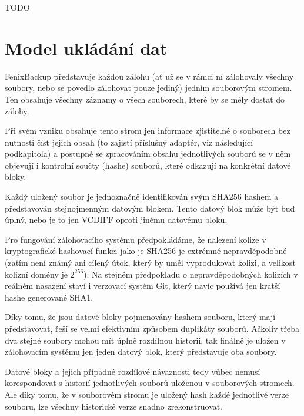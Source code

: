 TODO

\section{Model ukládání dat}

FenixBackup představuje každou zálohu (ať už se v rámci ní zálohovaly všechny
soubory, nebo se povedlo zálohovat pouze jediný) jedním souborovým stromem. Ten
obsahuje všechny záznamy o všech souborech, které by se měly dostat do zálohy.

Při svém vzniku obsahuje tento strom jen informace zjistitelné o souborech bez
nutnosti číst jejich obsah (to zajistí příslušný adaptér, viz následující
podkapitola) a postupně se zpracováním obsahu jednotlivých souborů se v něm
objevují i kontrolní součty (hashe) souborů, které odkazují na konkrétní datové
bloky.


Každý uložený soubor je jednoznačně identifikován svým \gls{SHA256} hashem
a představován stejnojmenným datovým blokem. Tento datový blok může být buď
úplný, nebo je to jen \gls{VCDIFF} oproti jinému datovému bloku.

Pro fungování zálohovacího systému předpokládáme, že nalezení kolize v
kryptografické hashovací funkci jako je \gls{SHA256} je extrémně
nepravděpodobné (zatím není známý ani cílený útok, který by uměl vyprodukovat
kolizi, a velikost kolizní domény je $2^{256}$). Na stejném předpokladu
o nepravděpodobných kolizích v reálném nasazení staví i verzovací systém Git,
který navíc používá jen kratší hashe generované \gls{SHA1}.

Díky tomu, že jsou datové bloky pojmenovány hashem souboru, který mají
představovat, řeší se velmi efektivním způsobem duplikáty souborů. Ačkoliv třeba
dva stejné soubory mohou mít úplně rozdílnou historii, tak finálně je uložen
v zálohovacím systému jen jeden datový blok, který představuje oba soubory.

Datové bloky a jejich případné rozdílové návaznosti tedy vůbec nemusí
korespondovat s historií jednotlivých souborů uloženou v souborových stromech.
Ale díky tomu, že v souborovém stromu je uložený hash každé jednotlivé verze
souboru, lze všechny historické verze snadno zrekonstruovat.

